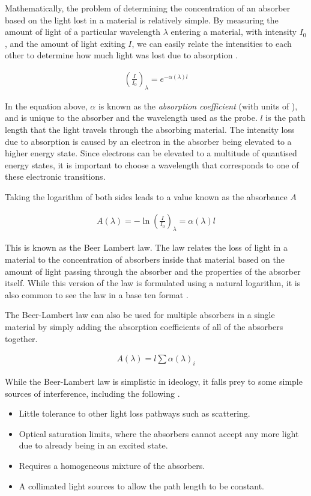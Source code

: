 Mathematically, the problem of determining the concentration of an absorber
based on the light lost in a material is relatively simple. By measuring the
amount of light of a particular wavelength $\lambda$ entering a material, with
intensity $I_0$, and the amount of light exiting $I$, we can easily relate the
intensities to each other to determine how much light was lost due to
absorption \cite{Hollas:2004uh}.

\begin{align*}
  \left(\frac{I}{I_0}\right)_\lambda = e^{-\alpha(\lambda)l}
\end{align*}

In the equation above, $\alpha$ is known as the \emph{absorption coefficient}
(with units of \icm), and is unique to the absorber and the wavelength
used as the probe. $l$ is the path length that the light travels through the
absorbing material. The intensity loss due to absorption is caused by an
electron in the absorber being elevated to a higher energy state. Since
electrons can be elevated to a multitude of quantised energy states, it is
important to choose a wavelength that corresponds to one of these electronic
transitions.

Taking the logarithm of both sides leads to a value known as the absorbance $A$

\begin{align}
  A(\lambda)=-\ln\left(\frac{I}{I_0}\right)_\lambda = \alpha(\lambda)l\label{eq:beer}
\end{align}

This is known as the Beer Lambert law. The law relates the loss of light in a
material to the concentration of absorbers inside that material based on the
amount of light passing through the absorber and the properties of the absorber
itself.  While this version of the  law is formulated using a natural logarithm, it is also common to see the law in a base ten format \cite{Hollas:2004uh}.

The Beer-Lambert law can also be used for multiple absorbers in a single material by simply adding the absorption coefficients of all of the absorbers together.

\begin{align*}
  A(\lambda) = l\sum\alpha(\lambda)_i
\end{align*}

While the Beer-Lambert law is simplistic in ideology, it falls prey to some simple sources of interference, including the following \cite{Skoog:1994wg}.
\begin{itemize}
  \item Little tolerance to other light loss pathways such as scattering.
  \item Optical saturation limits, where the absorbers cannot accept any more light due to already being in an excited state.
  \item Requires a homogeneous mixture of the absorbers.
  \item A collimated light sources to allow the path length to be constant.
\end{itemize}

